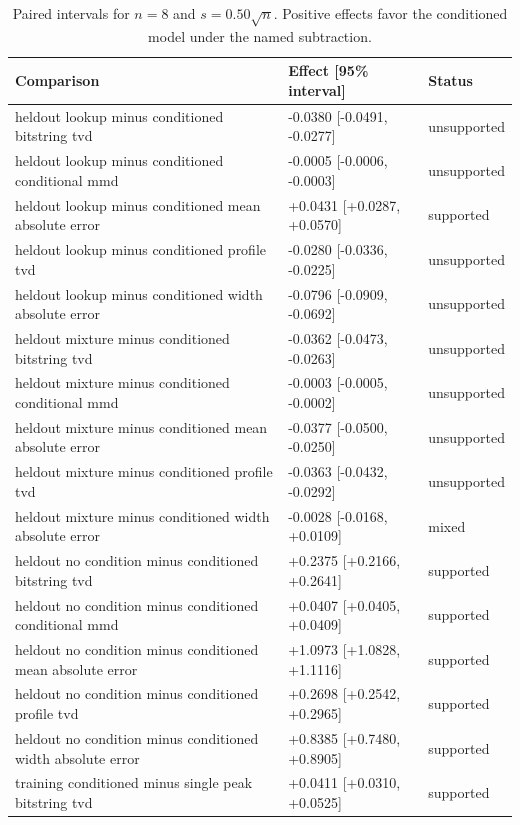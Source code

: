 \begin{table}[p]
\centering
\scriptsize
\setlength{\tabcolsep}{4pt}
\caption{Paired intervals for $n=8$ and $s=0.50\sqrt n$. Positive effects favor the conditioned model under the named subtraction.}
\label{tab:all-intervals-n8-w0.50}
\begin{tabular}{@{}p{}p{}p{}@{}}
\toprule
Comparison & Effect [95\% interval] & Status\\
\midrule
heldout lookup minus conditioned bitstring tvd & -0.0380 [-0.0491, -0.0277] & unsupported \\
heldout lookup minus conditioned conditional mmd & -0.0005 [-0.0006, -0.0003] & unsupported \\
heldout lookup minus conditioned mean absolute error & +0.0431 [+0.0287, +0.0570] & supported \\
heldout lookup minus conditioned profile tvd & -0.0280 [-0.0336, -0.0225] & unsupported \\
heldout lookup minus conditioned width absolute error & -0.0796 [-0.0909, -0.0692] & unsupported \\
heldout mixture minus conditioned bitstring tvd & -0.0362 [-0.0473, -0.0263] & unsupported \\
heldout mixture minus conditioned conditional mmd & -0.0003 [-0.0005, -0.0002] & unsupported \\
heldout mixture minus conditioned mean absolute error & -0.0377 [-0.0500, -0.0250] & unsupported \\
heldout mixture minus conditioned profile tvd & -0.0363 [-0.0432, -0.0292] & unsupported \\
heldout mixture minus conditioned width absolute error & -0.0028 [-0.0168, +0.0109] & mixed \\
heldout no condition minus conditioned bitstring tvd & +0.2375 [+0.2166, +0.2641] & supported \\
heldout no condition minus conditioned conditional mmd & +0.0407 [+0.0405, +0.0409] & supported \\
heldout no condition minus conditioned mean absolute error & +1.0973 [+1.0828, +1.1116] & supported \\
heldout no condition minus conditioned profile tvd & +0.2698 [+0.2542, +0.2965] & supported \\
heldout no condition minus conditioned width absolute error & +0.8385 [+0.7480, +0.8905] & supported \\
training conditioned minus single peak bitstring tvd & +0.0411 [+0.0310, +0.0525] & supported \\

\end{tabular}
\end{table}
